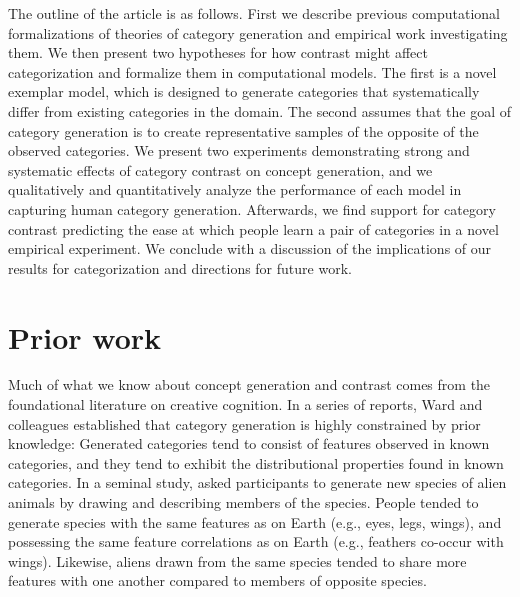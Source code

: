 \documentclass[12pt]{article}
\begin{document}
\begin{flushleft}
The outline of the article is as follows. First we describe previous
computational formalizations of theories of category generation and empirical
work investigating them. We then present two hypotheses for how contrast might
affect categorization and formalize them in computational models. The first is a
novel exemplar model, which is designed to generate categories that
systematically differ from existing categories in the domain. The second assumes
that the goal of category generation is to create representative samples of the
opposite of the observed categories. We present two experiments demonstrating
strong and systematic effects of category contrast on concept generation, and we
qualitatively and quantitatively analyze the performance of each model in
capturing human category generation. Afterwards, we find support for category
contrast predicting the ease at which people learn a pair of categories in a
novel empirical experiment. We conclude with a discussion of the implications of
our results for categorization and directions for future
work.

\section{Prior work}

Much of what we know about concept generation and contrast comes from the
foundational literature on creative cognition. In a series of reports, Ward and
colleagues
\citep{ward1995s,ward1994structured,marsh1999inadvertent,ward2002role,smith1993constraining}
established that category generation is highly constrained by prior knowledge:
Generated categories tend to consist of features observed in known categories,
and they tend to exhibit the distributional properties found in known
categories. In a seminal study, \cite{ward1994structured} asked participants to
generate new species of alien animals by drawing and describing members of the
species. People tended to generate species with the same features as on Earth
(e.g., eyes, legs, wings), and possessing the same feature correlations as on
Earth (e.g., feathers co-occur with wings). Likewise, aliens drawn from the same
species tended to share more features with one another compared to members of
opposite species.


\end{flushleft}
\end{document}
